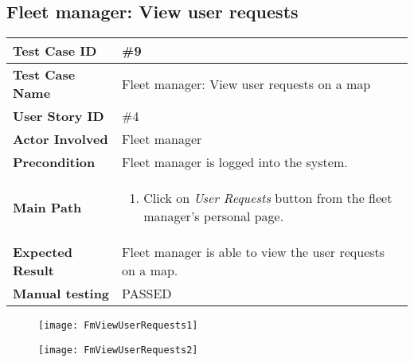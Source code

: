 \subsection{Fleet manager: View  user requests}
\begin{center}
	\begin{tabular} { | m{3.5cm} | m{9.5cm} | }
		\hline
		\textbf{Test Case ID} & \#9\\
		\hline
		\textbf{Test Case Name} & Fleet manager: View user requests on a map\\
		\hline
		\textbf{User Story ID} & \#4 \\
		\hline
		\textbf{Actor Involved} & Fleet manager\\
		\hline
		\textbf{Precondition} & Fleet manager is logged into the system.\\
		\hline
		\textbf{Main Path} & 
		\begin{enumerate}
			\item Click on \textit{User Requests} button from the fleet manager's personal page.
		\end{enumerate}\\
		\hline
		\textbf{Expected Result} & Fleet manager is able to view the user requests on a map.\\
		\hline
	\textbf{Manual testing} & PASSED\\
	\hline
\end{tabular}
\end{center}
\begin{figure}[H]
\centering
\texttt{[image: FmViewUserRequests1]}
\end{figure}
\begin{figure}[H]
\centering
\texttt{[image: FmViewUserRequests2]}
\end{figure}
\newpage
